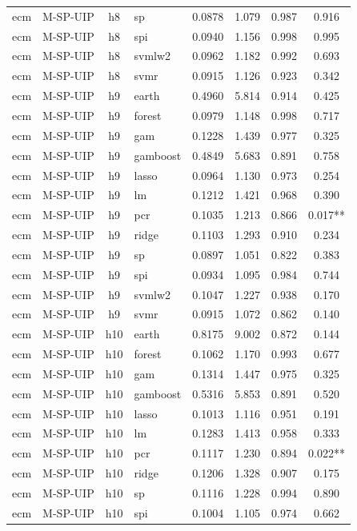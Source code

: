\begin{ThreePartTable}
\begin{longtable}[t]{llclcccc}
ecm & M-SP-UIP & h8 & sp & 0.0878 & 1.079 & 0.987 & 0.916\\
ecm & M-SP-UIP & h8 & spi & 0.0940 & 1.156 & 0.998 & 0.995\\
ecm & M-SP-UIP & h8 & svmlw2 & 0.0962 & 1.182 & 0.992 & 0.693\\
ecm & M-SP-UIP & h8 & svmr & 0.0915 & 1.126 & 0.923 & 0.342\\
\addlinespace
ecm & M-SP-UIP & h9 & earth & 0.4960 & 5.814 & 0.914 & 0.425\\
ecm & M-SP-UIP & h9 & forest & 0.0979 & 1.148 & 0.998 & 0.717\\
ecm & M-SP-UIP & h9 & gam & 0.1228 & 1.439 & 0.977 & 0.325\\
ecm & M-SP-UIP & h9 & gamboost & 0.4849 & 5.683 & 0.891 & 0.758\\
ecm & M-SP-UIP & h9 & lasso & 0.0964 & 1.130 & 0.973 & 0.254\\
ecm & M-SP-UIP & h9 & lm & 0.1212 & 1.421 & 0.968 & 0.390\\
ecm & M-SP-UIP & h9 & pcr & 0.1035 & 1.213 & 0.866 & 0.017**\\
ecm & M-SP-UIP & h9 & ridge & 0.1103 & 1.293 & 0.910 & 0.234\\
ecm & M-SP-UIP & h9 & sp & 0.0897 & 1.051 & 0.822 & 0.383\\
ecm & M-SP-UIP & h9 & spi & 0.0934 & 1.095 & 0.984 & 0.744\\
ecm & M-SP-UIP & h9 & svmlw2 & 0.1047 & 1.227 & 0.938 & 0.170\\
ecm & M-SP-UIP & h9 & svmr & 0.0915 & 1.072 & 0.862 & 0.140\\
\addlinespace
ecm & M-SP-UIP & h10 & earth & 0.8175 & 9.002 & 0.872 & 0.144\\
ecm & M-SP-UIP & h10 & forest & 0.1062 & 1.170 & 0.993 & 0.677\\
ecm & M-SP-UIP & h10 & gam & 0.1314 & 1.447 & 0.975 & 0.325\\
ecm & M-SP-UIP & h10 & gamboost & 0.5316 & 5.853 & 0.891 & 0.520\\
ecm & M-SP-UIP & h10 & lasso & 0.1013 & 1.116 & 0.951 & 0.191\\
ecm & M-SP-UIP & h10 & lm & 0.1283 & 1.413 & 0.958 & 0.333\\
ecm & M-SP-UIP & h10 & pcr & 0.1117 & 1.230 & 0.894 & 0.022**\\
ecm & M-SP-UIP & h10 & ridge & 0.1206 & 1.328 & 0.907 & 0.175\\
ecm & M-SP-UIP & h10 & sp & 0.1116 & 1.228 & 0.994 & 0.890\\
ecm & M-SP-UIP & h10 & spi & 0.1004 & 1.105 & 0.974 & 0.662\\

\end{longtable}
\end{ThreePartTable}
